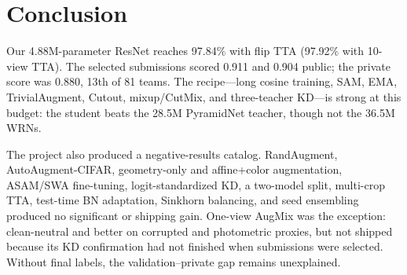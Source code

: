 \section{Conclusion}
\label{sec:conclusion}

Our 4.88M-parameter ResNet reaches 97.84\% with flip TTA (97.92\% with 10-view
TTA). The selected submissions scored 0.911 and 0.904 public; the private score
was 0.880, 13th of 81 teams. The recipe---long cosine training, SAM, EMA,
TrivialAugment, Cutout, mixup/CutMix, and three-teacher KD---is strong at this
budget: the student beats the 28.5M PyramidNet teacher, though not the 36.5M
WRNs.

The project also produced a negative-results catalog. RandAugment,
AutoAugment-CIFAR, geometry-only and affine+color augmentation, ASAM/SWA
fine-tuning, logit-standardized KD, a two-model split, multi-crop TTA, test-time
BN adaptation, Sinkhorn balancing, and seed ensembling produced no significant or
shipping gain. One-view AugMix was the exception: clean-neutral and better on
corrupted and photometric proxies, but not shipped because its KD confirmation
had not finished when submissions were selected. Without final labels, the validation--private gap remains unexplained.
